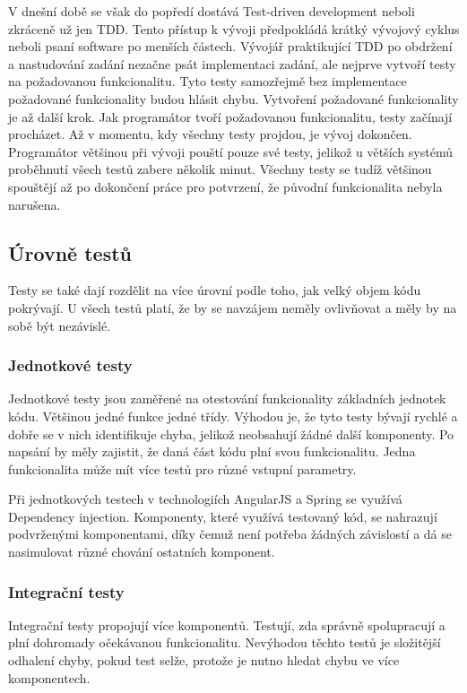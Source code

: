\documentclass[czech,master,public,dept460,male,cpdeclaration,twoside]{diploma}
\begin{document}
V dnešní době se však do popředí dostává Test-driven development neboli zkráceně už jen TDD. Tento přístup k vývoji předpokládá krátký vývojový cyklus neboli psaní software po menších částech. Vývojář praktikující TDD po obdržení a nastudování zadání nezačne psát implementaci zadání, ale nejprve vytvoří testy na požadovanou funkcionalitu. Tyto testy samozřejmě bez implementace požadované funkcionality budou hlásit chybu. Vytvoření požadované funkcionality je až další krok. Jak programátor tvoří požadovanou funkcionalitu, testy začínají procházet. Až v momentu, kdy všechny testy projdou, je vývoj dokončen. Programátor většinou při vývoji pouští pouze své testy, jelikož u větších systémů proběhnutí všech testů zabere několik minut. Všechny testy se tudíž většinou spouštějí až po dokončení práce pro potvrzení, že původní funkcionalita nebyla narušena.

\subsection{Úrovně testů}
Testy se také dají rozdělit na více úrovní podle toho, jak velký objem kódu pokrývají. U všech testů platí, že by se navzájem neměly ovlivňovat a měly by na sobě být nezávislé.

\subsubsection{Jednotkové testy}
Jednotkové testy jsou zaměřené na otestování funkcionality základních jednotek kódu. Většinou jedné funkce jedné třídy. Výhodou je, že tyto testy bývají rychlé a dobře se v nich identifikuje chyba, jelikož neobsahují žádné další komponenty. Po napsání by měly zajistit, že daná část kódu plní svou funkcionalitu. Jedna funkcionalita může mít více testů pro různé vstupní parametry.

Při jednotkových testech v technologiích AngularJS a Spring se využívá Dependency injection. Komponenty, které využívá testovaný kód, se nahrazují podvrženými komponentami, díky čemuž není potřeba žádných závislostí a dá se nasimulovat různé chování ostatních komponent.

\subsubsection{Integrační testy}
Integrační testy propojují více komponentů. Testují, zda správně spolupracují a plní dohromady očekávanou funkcionalitu. Nevýhodou těchto testů je složitější odhalení chyby, pokud test selže, protože je nutno hledat chybu ve více komponentech. 
\end{document}
